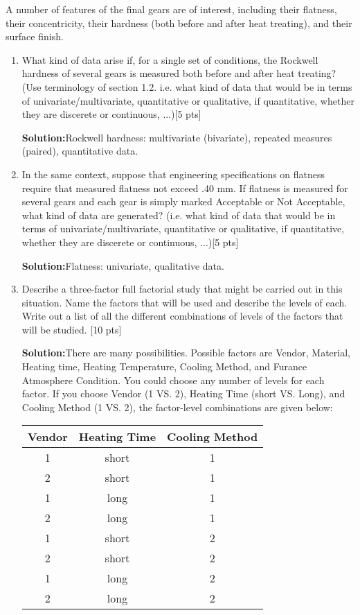 \documentclass[11pt]{article}\usepackage[]{graphicx}\usepackage[]{color}
\begin{document}
\begin{enumerate}
A number of features of the final gears are of interest, including their flatness, their concentricity, their hardness (both before and after heat treating), and their surface finish. 

    \begin{enumerate}
      \item What kind of data arise if, for a single set of conditions, the Rockwell hardness of several gears is measured both before and after heat treating? (Use terminology of section 1.2. i.e. what kind of data that would be in terms of univariate/multivariate, quantitative or qualitative, if quantitative, whether they are discerete or continuous, ...)[5 pts]
      
      \textbf{Solution:}Rockwell hardness: multivariate (bivariate), repeated measures (paired), quantitative data. 
      
      \item In the same context, suppose that engineering specifications on flatness require that measured flatness not exceed .40 mm. If flatness is measured for several gears and each gear is simply marked Acceptable or Not Acceptable, what kind of data are generated? (i.e. what kind of data that would be in terms of univariate/multivariate, quantitative or qualitative, if quantitative, whether they are discerete or continuous, ...)[5 pts]
      
      \textbf{Solution:}Flatness: univariate, qualitative data.
      
      \item Describe a three-factor full factorial study that might be carried out in this situation. Name the factors that will be used and describe the levels of each. Write out a list of all the different combinations of levels of the factors that will be studied. [10 pts]
      
      \textbf{Solution:}There are many possibilities. Possible factors are Vendor, Material, Heating time, Heating Temperature, Cooling Method, and Furance Atmosphere Condition. You could choose any number of levels for each factor. If you choose Vendor (1 VS. 2), Heating Time (short VS. Long), and Cooling Method (1 VS. 2), the factor-level combinations are given below:
\hspace{1in}
\begin{center}
	\begin{tabular}{|c|c|c|}\hline
		 Vendor & Heating Time & Cooling Method   \\ [0.5ex] 
		 \hline\hline
		1 & short&1 \\
		2 & short&1 \\
		1 & long&1  \\
		2 & long&1 \\
		1 & short&2 \\
		2 & short&2  \\
		1 & long&2  \\
		2 & long&2  \\
		\hline
	\end{tabular}
\end{center}
\hspace{1 in}


\end{enumerate}
\end{enumerate}
\end{document}
